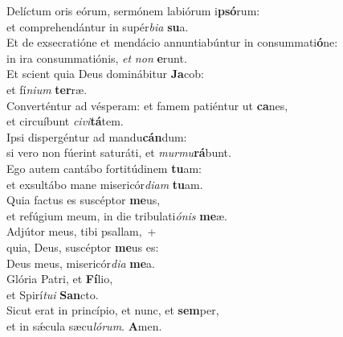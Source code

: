 \oddverse Delíctum oris eórum, sermónem labiórum i\textbf{psó}rum:~\*\\
\oddverse et comprehendántur in supér\textit{bi}\textit{a} \textbf{su}a.\\
\evenverse Et de exsecratióne et mendácio annuntiabúntur in consummati\textbf{ó}ne:~\*\\
\evenverse in ira consummatiónis, \textit{et} \textit{non} \textbf{e}runt.\\
\oddverse Et scient quia Deus dominábitur \textbf{Ja}cob:~\*\\
\oddverse et fí\textit{ni}\textit{um} \textbf{ter}ræ.\\
\evenverse Converténtur ad vésperam: et famem patiéntur ut \textbf{ca}nes,~\*\\
\evenverse et circuíbunt \textit{ci}\textit{vi}\textbf{tá}tem.\\
\oddverse Ipsi dispergéntur ad mandu\textbf{cán}dum:~\*\\
\oddverse si vero non fúerint saturáti, et \textit{mur}\textit{mu}\textbf{rá}bunt.\\
\evenverse Ego autem cantábo fortitúdinem \textbf{tu}am:~\*\\
\evenverse et exsultábo mane misericór\textit{di}\textit{am} \textbf{tu}am.\\
\oddverse Quia factus es suscéptor \textbf{me}us,~\*\\
\oddverse et refúgium meum, in die tribulati\textit{ó}\textit{nis} \textbf{me}æ.\\
\evenverse Adjútor meus, tibi psallam,~+\\
\evenverse  quia, Deus, suscéptor \textbf{me}us es:~\*\\
\evenverse Deus meus, misericór\textit{di}\textit{a} \textbf{me}a.\\
\oddverse Glória Patri, et \textbf{Fí}lio,~\*\\
\oddverse et Spirí\textit{tu}\textit{i} \textbf{San}cto.\\
\evenverse Sicut erat in princípio, et nunc, et \textbf{sem}per,~\*\\
\evenverse et in sǽcula sæcu\textit{ló}\textit{rum}. \textbf{A}men.\\
